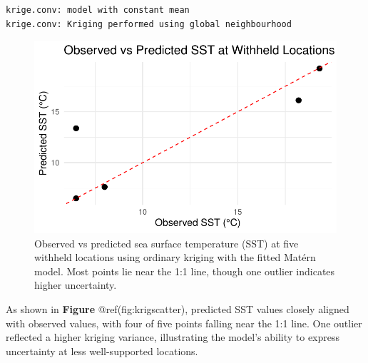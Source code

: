 \documentclass[
  11pt,
]{article}
\newenvironment{Shaded}{\begin{snugshade}}{\end{snugshade}}
\newcommand{\AttributeTok}[1]{\textcolor[rgb]{0.40,0.45,0.13}{#1}}
\newcommand{\FunctionTok}[1]{\textcolor[rgb]{0.28,0.35,0.67}{#1}}
\newcommand{\NormalTok}[1]{\textcolor[rgb]{0.00,0.23,0.31}{#1}}
\newcommand{\OtherTok}[1]{\textcolor[rgb]{0.00,0.23,0.31}{#1}}
\newcommand{\SpecialCharTok}[1]{\textcolor[rgb]{0.37,0.37,0.37}{#1}}
\begin{document}
\begin{verbatim}
krige.conv: model with constant mean
krige.conv: Kriging performed using global neighbourhood 
\end{verbatim}

\begin{Shaded}
\end{Shaded}

\begin{figure}[H]

{\centering \includegraphics{project_files/figure-pdf/fig-krigscatter-1.pdf}

}

\caption{Observed vs predicted sea surface temperature (SST) at five
withheld locations using ordinary kriging with the fitted Matérn model.
Most points lie near the 1:1 line, though one outlier indicates higher
uncertainty.}

\end{figure}%

As shown in \textbf{Figure} @ref(fig:krigscatter), predicted SST values
closely aligned with observed values, with four of five points falling
near the 1:1 line. One outlier reflected a higher kriging variance,
illustrating the model's ability to express uncertainty at less
well-supported locations.
\end{document}
